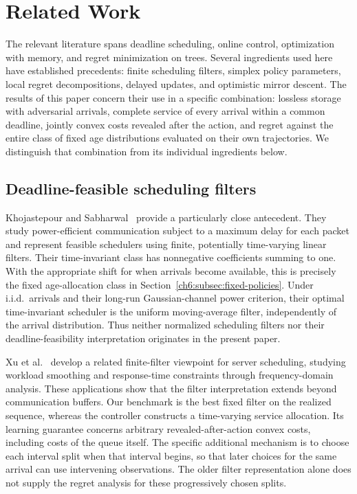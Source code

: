 \documentclass[11pt]{article}
\theoremstyle{plain}
\theoremstyle{remark}
\numberwithin{equation}{section}
\begin{document}
\section{Related Work}
\label{ch6:sec:related}

The relevant literature spans deadline scheduling, online control,
optimization with memory, and regret minimization on trees. Several
ingredients used here have established precedents: finite scheduling
filters, simplex policy parameters, local regret decompositions, delayed
updates, and optimistic mirror descent. The results of this paper concern
their use in a specific combination: lossless storage with adversarial
arrivals, complete service of every arrival within a common deadline,
jointly convex costs revealed after the action, and regret against the
entire class of fixed age distributions evaluated on their own
trajectories. We distinguish that combination from its individual
ingredients below.

\subsection{Deadline-feasible scheduling filters}
\label{ch6:subsec:related-scheduling}

Khojastepour and Sabharwal~\cite{khojastepour2004delay} provide a particularly
close antecedent. They study power-efficient communication subject to a
maximum delay for each packet and represent feasible schedulers using
finite, potentially time-varying linear filters. Their time-invariant
class has nonnegative coefficients summing to one. With the appropriate
shift for when arrivals become available, this is precisely the fixed
age-allocation class in Section~\ref{ch6:subsec:fixed-policies}. Under
i.i.d.\ arrivals and their long-run Gaussian-channel power criterion,
their optimal time-invariant scheduler is the uniform moving-average
filter, independently of the arrival distribution. Thus
neither normalized scheduling filters nor their deadline-feasibility
interpretation originates in the present paper.

Xu et al.~\cite{xu2010filter} develop a related finite-filter viewpoint for
server scheduling, studying workload smoothing and response-time
constraints through frequency-domain analysis. These applications show
that the filter interpretation extends beyond communication buffers.
Our benchmark is the best fixed filter on the realized sequence, whereas
the controller constructs a time-varying service allocation. Its learning
guarantee concerns arbitrary revealed-after-action convex costs, including
costs of the queue itself. The specific additional mechanism is to choose
each interval split when that interval begins, so that later choices for
the same arrival can use intervening observations. The older filter
representation alone does not supply the regret analysis for these
progressively chosen splits.
\end{document}
